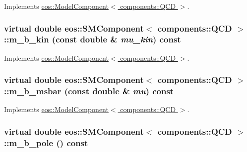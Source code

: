 Implements \hyperlink{classeos_1_1ModelComponent_3_01components_1_1QCD_01_4_abf241eb181bace5db7f3ac6f303d2eec}{eos::ModelComponent$<$ components::QCD $>$}.\hypertarget{classeos_1_1SMComponent_3_01components_1_1QCD_01_4_a722ab7fc7efbfd60d0088e4349e29b5b}{
\subsubsection[{m\_\-b\_\-kin}]{\setlength{\rightskip}{0pt plus 5cm}virtual double eos::SMComponent$<$ components::QCD $>$::m\_\-b\_\-kin (const double \& {\em mu\_\-kin}) const}}
\label{classeos_1_1SMComponent_3_01components_1_1QCD_01_4_a722ab7fc7efbfd60d0088e4349e29b5b}


Implements \hyperlink{classeos_1_1ModelComponent_3_01components_1_1QCD_01_4_ad8449029b487c614a769e1b0d6012e4c}{eos::ModelComponent$<$ components::QCD $>$}.\hypertarget{classeos_1_1SMComponent_3_01components_1_1QCD_01_4_a81b71218baa85173813f67b363c73924}{
\subsubsection[{m\_\-b\_\-msbar}]{\setlength{\rightskip}{0pt plus 5cm}virtual double eos::SMComponent$<$ components::QCD $>$::m\_\-b\_\-msbar (const double \& {\em mu}) const}}
\label{classeos_1_1SMComponent_3_01components_1_1QCD_01_4_a81b71218baa85173813f67b363c73924}


Implements \hyperlink{classeos_1_1ModelComponent_3_01components_1_1QCD_01_4_a1707fd6c3e6a4d8e02437652a3492f73}{eos::ModelComponent$<$ components::QCD $>$}.\hypertarget{classeos_1_1SMComponent_3_01components_1_1QCD_01_4_ae2a177d11900636dec6d7d7c9040b9fb}{
\subsubsection[{m\_\-b\_\-pole}]{\setlength{\rightskip}{0pt plus 5cm}virtual double eos::SMComponent$<$ components::QCD $>$::m\_\-b\_\-pole () const}}
\label{classeos_1_1SMComponent_3_01components_1_1QCD_01_4_ae2a177d11900636dec6d7d7c9040b9fb}


